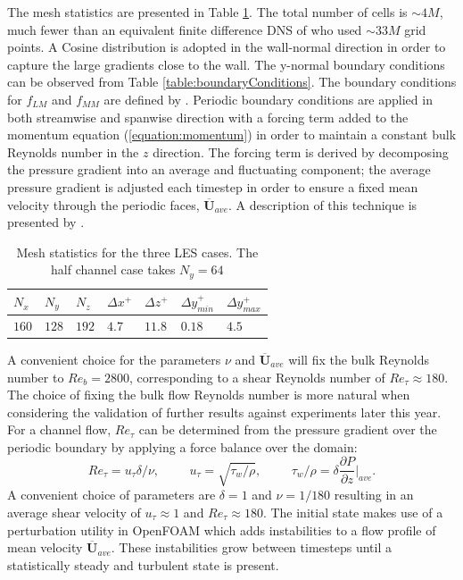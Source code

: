 \documentclass[12pt,oneside,a4paper]{article}
\newcommand{\pdev}[2]{\frac{\partial {#1}}{\partial {#2}}}
\newcommand{\vect}[1]{\boldsymbol{#1}}
\begin{document}
The mesh statistics are presented in Table \ref{table:meshStatistics}. The total number of cells is $\sim 4M$, much fewer than an equivalent finite difference DNS of \cite{vreman2014} who used $\sim 33M$ grid points. A Cosine distribution is adopted in the wall-normal direction in order to capture the large gradients close to the wall. The y-normal boundary conditions can be observed from Table \ref{table:boundaryConditions}. The boundary conditions for $f_{LM}$ and $f_{MM}$ are defined by \cite{meneveau1996}. Periodic boundary conditions are applied in both streamwise and spanwise direction with a forcing term added to the momentum equation (\ref{equation:momentum}) in order to maintain a constant bulk Reynolds number in the $z$ direction. The forcing term is derived by decomposing the pressure gradient into an average and fluctuating component; the average pressure gradient is adjusted each timestep in order to ensure a fixed mean velocity through the periodic faces, $ \overline{\vect{U}}_{ave} $. A description of this technique is presented by \cite{murthy1997}.

\begin{table}[!b]
\centering
\caption{Mesh statistics for the three LES cases. The half channel case takes $N_y = 64$}
\label{table:meshStatistics}
\begin{tabular}{|l|l|l|l|l|l|l|}
\hline
$N_x$  & $N_y$  & $N_z$  & $\Delta x^+$ & $\Delta z^+$ & $\Delta y^+_{min}$ & $\Delta y^+_{max}$ \\ \hline
$160$ & $128$ & $192$ & $4.7$     & $11.8$    & $0.18$           & $4.5          $ \\ \hline
\end{tabular}
\end{table}

A convenient choice for the parameters $\nu$ and $ \overline{\vect{U}}_{ave} $ will fix the bulk Reynolds number to $Re_b = 2800$, corresponding to a shear Reynolds number of $Re_\tau \approx 180$. The choice of fixing the bulk flow Reynolds number is more natural when considering the validation of further results against experiments later this year. For a channel flow, $Re_\tau$ can be determined from the pressure gradient over the periodic boundary by applying a force balance over the domain:
$$	Re_\tau = u_\tau \delta / \nu, \hspace{1cm} u_\tau = \sqrt{\tau_w / \rho},	\hspace{1cm}	\tau_w / \rho = \delta \pdev{P}{z}\bigg\vert_{ave}. 	$$
A convenient choice of parameters are $\delta = 1$ and $\nu = 1/180$ resulting in an average shear velocity of $u_\tau \approx 1$ and $Re_\tau \approx 180$. The initial state makes use of a perturbation utility in OpenFOAM which adds instabilities to a flow profile of mean velocity $ \overline{\vect{U}}_{ave} $. These instabilities grow between timesteps until a statistically steady and turbulent state is present. 
\end{document}
